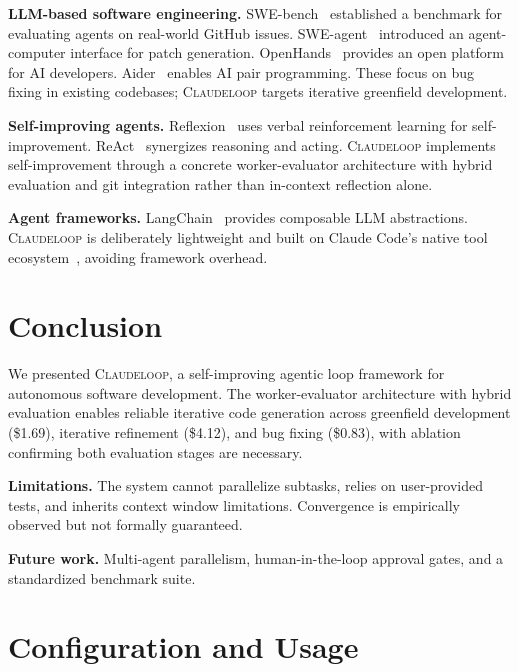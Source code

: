 \documentclass{article}
\begin{document}
\textbf{LLM-based software engineering.}
SWE-bench~\cite{jimenez2024swebench} established a benchmark for evaluating agents on real-world GitHub issues.
SWE-agent~\cite{yang2024sweagent} introduced an agent-computer interface for patch generation.
OpenHands~\cite{wang2024openhands} provides an open platform for AI developers.
Aider~\cite{gauthier2024aider} enables AI pair programming.
These focus on bug fixing in existing codebases; \textsc{Claudeloop} targets iterative greenfield development.

\textbf{Self-improving agents.}
Reflexion~\cite{shinn2023reflexion} uses verbal reinforcement learning for self-improvement.
ReAct~\cite{yao2023react} synergizes reasoning and acting.
\textsc{Claudeloop} implements self-improvement through a concrete worker-evaluator architecture with hybrid evaluation and git integration rather than in-context reflection alone.

\textbf{Agent frameworks.}
LangChain~\cite{chase2022langchain} provides composable LLM abstractions.
\textsc{Claudeloop} is deliberately lightweight and built on Claude Code's native tool ecosystem~\cite{anthropic2025claude}, avoiding framework overhead.

\section{Conclusion}

We presented \textsc{Claudeloop}, a self-improving agentic loop framework for autonomous software development. The worker-evaluator architecture with hybrid evaluation enables reliable iterative code generation across greenfield development (\$1.69), iterative refinement (\$4.12), and bug fixing (\$0.83), with ablation confirming both evaluation stages are necessary.

\textbf{Limitations.} The system cannot parallelize subtasks, relies on user-provided tests, and inherits context window limitations. Convergence is empirically observed but not formally guaranteed.

\textbf{Future work.} Multi-agent parallelism, human-in-the-loop approval gates, and a standardized benchmark suite.




\appendix
\section{Configuration and Usage}
\label{app:config}
\end{document}
